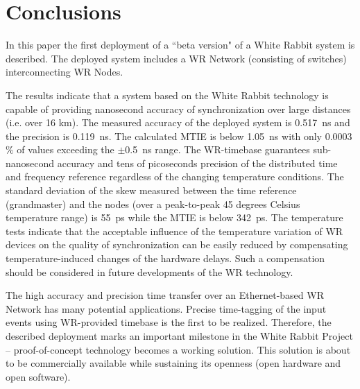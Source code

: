 \section{Conclusions}
\label{sec:conclusions}

In this paper the first deployment of a ``beta version" of a White Rabbit
system is described. The deployed system includes a WR Network (consisting of switches) 
interconnecting WR Nodes. 

The results indicate that a system based on the 
White Rabbit technology is capable of providing nanosecond accuracy of synchronization 
over large distances (i.e. over 16 km). The measured accuracy of the deployed system  
is 0.517~ns and the precision is 0.119~ns. The calculated MTIE is below 1.05~ns
with only 0.0003$\%$ of values exceeding the $\pm$0.5~ns range.
The WR-timebase 
guarantees sub-nanosecond accuracy and tens of picoseconds precision of the distributed time 
and frequency reference regardless of the changing temperature conditions. 
The standard deviation of the skew measured between the time reference (grandmaster) and 
the nodes (over a peak-to-peak 45 
degrees Celsius temperature range) is 55~ps while the MTIE is below 342~ps. 
The temperature tests indicate that the acceptable influence   
of the temperature variation of WR devices on the quality of synchronization can be easily
reduced by compensating temperature-induced changes of the hardware delays. 
Such a compensation should be considered in future developments of the WR technology.

The high accuracy and precision time transfer over an Ethernet-based WR Network has many potential
applications. Precise time-tagging of the input events using WR-provided timebase is the first to
be realized. Therefore, the described deployment marks an important milestone in the White Rabbit Project -- 
proof-of-concept technology becomes a working solution. This solution is about to be 
commercially available while sustaining its openness (open hardware and open software). 


\newpage